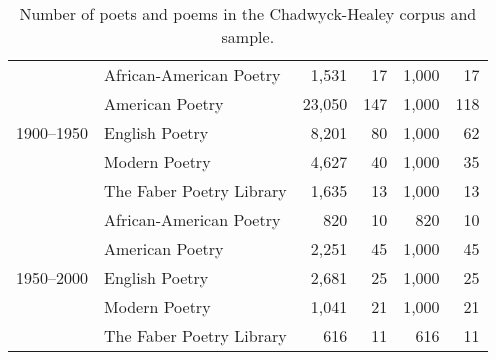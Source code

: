 \begin{table}[t]
{\begin{tabular}{llrrrr}
\multirow[t]{5}{*}{1900--1950} & African-American Poetry & 1,531 & 17 & 1,000 & 17 \\
 & American Poetry & 23,050 & 147 & 1,000 & 118 \\
 & English Poetry & 8,201 & 80 & 1,000 & 62 \\
 & Modern Poetry & 4,627 & 40 & 1,000 & 35 \\
 & The Faber Poetry Library & 1,635 & 13 & 1,000 & 13 \\
\cline{1-6}
\multirow[t]{5}{*}{1950--2000} & African-American Poetry & 820 & 10 & 820 & 10 \\
 & American Poetry & 2,251 & 45 & 1,000 & 45 \\
 & English Poetry & 2,681 & 25 & 1,000 & 25 \\
 & Modern Poetry & 1,041 & 21 & 1,000 & 21 \\
 & The Faber Poetry Library & 616 & 11 & 616 & 11 \\
\bottomrule
\end{tabular}
}
\caption{Number of poets and poems in the Chadwyck-Healey corpus and sample.}
\label{tab:num_poems_corpus}
\end{table}